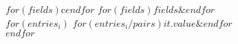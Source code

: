 \begin{center}
\begin{tabular}{$for(fields)$c$endfor$}
$for(fields)$$fields$&$endfor$\\
$for(entries_i)$
$for(entries_i/pairs)$$it.value$&$endfor$\\
$endfor$
\end{tabular}
\end{center}
